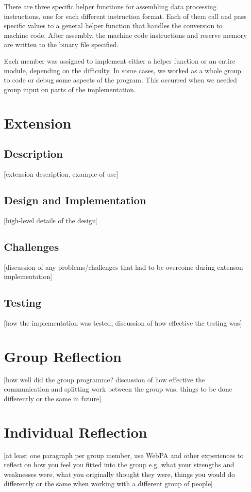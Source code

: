 \documentclass[11pt]{article}
\begin{document}
There are three specific helper functions for assembling data processing instructions,
one for each different instruction format.
Each of them call and pass specific values to a general helper function that handles 
the conversion to machine code. 
After assembly, the machine code instructions and reserve memory are written to the binary file specified.

Each member was assigned to implement either a helper function or an entire module, depending on the difficulty.
In some cases, we worked as a whole group to code or debug some aspects of the program.
This occurred when we needed group input on parts of the implementation. 

\newpage

\section{Extension}
\subsection{Description}
[extension description, example of use]

\subsection{Design and Implementation}
[high-level details of the design]

\subsection{Challenges}
[discussion of any problems/challenges that had to be overcome during extenson implementation]

\subsection{Testing}
[how the implementation was tested, discussion of how effective the testing was]

\section{Group Reflection}
[how well did the group programme? discussion of how effective the communication and splitting work between the group was, things to be done differently or the same in future]

\section{Individual Reflection}
[at least one paragraph per group member, use WebPA and other experiences to reflect on how you feel you fitted into the group e.g. what your strengths and weaknesses were, what you originally thought they were, things you would do differently or the same when working with a different group of people]
\end{document}
